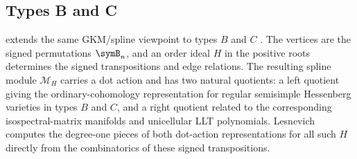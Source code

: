 \subsection[dotActionTypeBC]{Types B and C}

 extends the same GKM/spline
viewpoint to types $B$ and $C$ \cite{Lesnevich2025x}.  The vertices are the
signed permutations $\symB_n$, and an order ideal $H$ in the positive roots
determines the signed transpositions and edge relations.  The resulting spline
module $\mathcal M_H$ carries a dot action and has two natural quotients: a
left quotient giving the ordinary-cohomology representation for regular
semisimple Hessenberg varieties in types $B$ and $C$, and a right quotient
related to the corresponding isospectral-matrix manifolds and unicellular LLT
polynomials.  Lesnevich computes the degree-one pieces of both dot-action
representations for all such $H$ directly from the combinatorics of these signed
transpositions.
